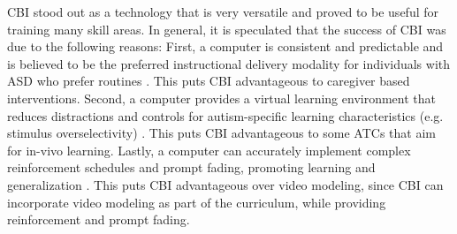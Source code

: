 \documentclass{ut-thesis}
\begin{document}
CBI stood out as a technology that is very versatile and proved to be useful for training many skill areas.  In general, it is speculated that the success of CBI was due to the following reasons: First, a computer is consistent and predictable and is believed to be the preferred instructional delivery modality for individuals with ASD who prefer routines \cite{ramdoss2011use}.  This puts CBI advantageous to caregiver based interventions.  Second, a computer provides a virtual learning environment that reduces distractions and controls for autism-specific learning characteristics (e.g. stimulus overselectivity) \cite{lovaas1979stimulus}.  This puts CBI advantageous to some ATCs that aim for in-vivo learning.  Lastly, a computer can accurately implement complex reinforcement schedules and prompt fading, promoting learning and generalization \cite{ramdoss2011useb}.  This puts CBI advantageous over video modeling, since CBI can incorporate video modeling as part of the curriculum, while providing reinforcement and prompt fading.
\end{document}
